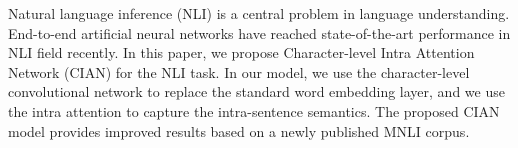 Natural language inference (NLI) is a central problem in language understanding. End-to-end artificial neural networks have reached state-of-the-art  performance in NLI field recently. In this paper, we propose Character-level Intra Attention Network (CIAN) for the NLI task. In our model, we use the character-level convolutional network to replace the standard word embedding layer, and we use the intra attention to capture the intra-sentence semantics. The proposed CIAN model provides improved results based on a newly published MNLI corpus.
